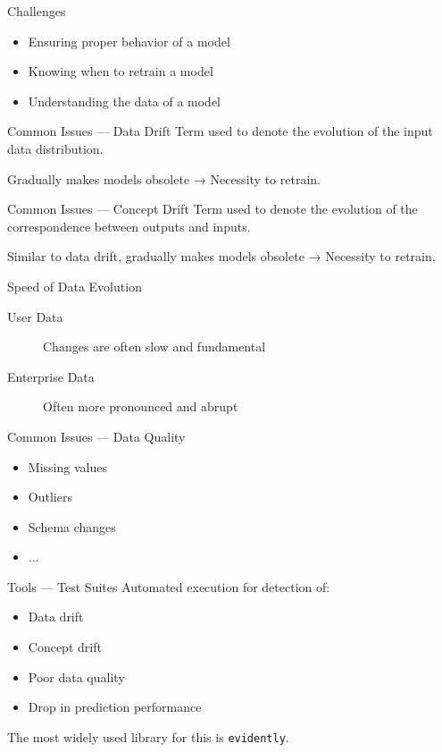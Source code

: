 \begin{frame}{Challenges}
  \begin{itemize}
    \item Ensuring proper behavior of a model
    \item Knowing when to retrain a model
    \item Understanding the data of a model
  \end{itemize}
\end{frame}

\begin{frame}{Common Issues — Data Drift}
  Term used to denote the evolution of the input data distribution.

  Gradually makes models obsolete → Necessity to retrain.
\end{frame}

\begin{frame}{Common Issues — Concept Drift}
  Term used to denote the evolution of the correspondence between outputs and inputs.

  Similar to data drift, gradually makes models obsolete → Necessity to retrain.
\end{frame}

\begin{frame}{Speed of Data Evolution}
  \begin{description}
    \item[User Data] Changes are often slow and fundamental
    \item[Enterprise Data] Often more pronounced and abrupt
  \end{description}
\end{frame}

\begin{frame}{Common Issues — Data Quality}
  \begin{itemize}
    \item Missing values
    \item Outliers
    \item Schema changes
    \item ...
  \end{itemize}
\end{frame}

\begin{frame}{Tools — Test Suites}
  Automated execution for detection of:
  \begin{itemize}
    \item Data drift
    \item Concept drift
    \item Poor data quality
    \item Drop in prediction performance
  \end{itemize}
  The most widely used library for this is \texttt{evidently}.
\end{frame}

